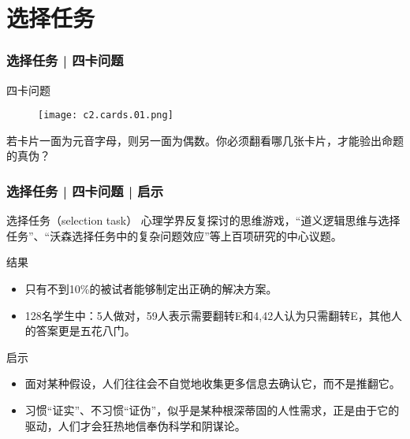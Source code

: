 \section{选择任务}
\begin{frame}
  \frametitle{选择任务 | 四卡问题}
  \begin{block}{四卡问题}
    \begin{figure}
      \centering
      \texttt{[image: c2.cards.01.png]}
    \end{figure}
    若卡片一面为元音字母，则另一面为偶数。你必须翻看哪几张卡片，才能验出命题的真伪？
  \end{block}
\end{frame}

\begin{frame}
  \frametitle{选择任务 | 四卡问题 | 启示}
  \begin{block}{选择任务（selection task）}
 心理学界反复探讨的思维游戏，“道义逻辑思维与选择任务”、“沃森选择任务中的复杂问题效应”等上百项研究的中心议题。
  \end{block}
  \pause
  \begin{block}{结果}
    \begin{itemize}
      \item 只有不到10\%的被试者能够制定出正确的解决方案。
      \item 128名学生中：5人做对，59人表示需要翻转E和4,42人认为只需翻转E，其他人的答案更是五花八门。
    \end{itemize}
  \end{block}
  \pause
  \begin{block}{启示}
    \begin{itemize}
      \item 面对某种假设，人们往往会不自觉地收集更多信息去确认它，而不是推翻它。
      \item 习惯“证实”、不习惯“证伪”，似乎是某种根深蒂固的人性需求，正是由于它的驱动，人们才会狂热地信奉伪科学和阴谋论。
    \end{itemize}
  \end{block}
\end{frame}

